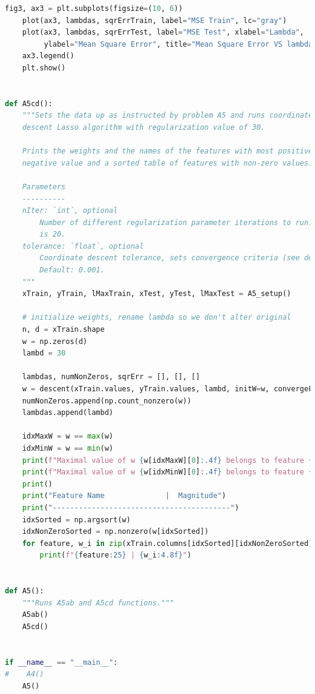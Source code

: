 \documentclass{article}
\newcommand{\1}{\mathbf{1}}
\begin{document}
\begin{enumerate}
\begin{lstlisting}[language=Python]
    fig3, ax3 = plt.subplots(figsize=(10, 6))
    plot(ax3, lambdas, sqrErrTrain, label="MSE Train", lc="gray")
    plot(ax3, lambdas, sqrErrTest, label="MSE Test", xlabel="Lambda",
         ylabel="Mean Square Error", title="Mean Square Error VS lambda.")
    ax3.legend()
    plt.show()


def A5cd():
    """Sets the data up as instructed by problem A5 and runs coordinate
    descent Lasso algorithm with regularization value of 30. 

    Prints the weights and the names of the features with most positive, most
    negative value and a sorted table of features with non-zero values.

    Parameters
    ----------
    nIter: `int`, optional
        Number of different regularization parameter iterations to run. Default
        is 20.
    tolerance: `float`, optional
        Coordinate descent tolerance, sets convergence criteria (see descent).
        Default: 0.001.
    """
    xTrain, yTrain, lMaxTrain, xTest, yTest, lMaxTest = A5_setup()

    # initialize weights, rename lambda so we don't alter original
    n, d = xTrain.shape
    w = np.zeros(d)
    lambd = 30

    lambdas, numNonZeros, sqrErr = [], [], []
    w = descent(xTrain.values, yTrain.values, lambd, initW=w, convergeFast=False)
    numNonZeros.append(np.count_nonzero(w))
    lambdas.append(lambd)

    idxMaxW = w == max(w)
    idxMinW = w == min(w)
    print(f"Maximal value of w {w[idxMaxW][0]:.4f} belongs to feature {xTrain.columns[idxMaxW][0]}")
    print(f"Maximal value of w {w[idxMinW][0]:.4f} belongs to feature {xTrain.columns[idxMinW][0]}")
    print()
    print("Feature Name              |  Magnitude")
    print("-----------------------------------------")
    idxSorted = np.argsort(w)
    idxNonZeroSorted = np.nonzero(w[idxSorted])
    for feature, w_i in zip(xTrain.columns[idxSorted][idxNonZeroSorted], w[idxSorted][idxNonZeroSorted]):
        print(f"{feature:25} | {w_i:4.8f}")


def A5():
    """Runs A5ab and A5cd functions."""
    A5ab()
    A5cd()


if __name__ == "__main__":
#    A4()
    A5()
\end{lstlisting}
\end{enumerate}



\newpage
\end{document}
